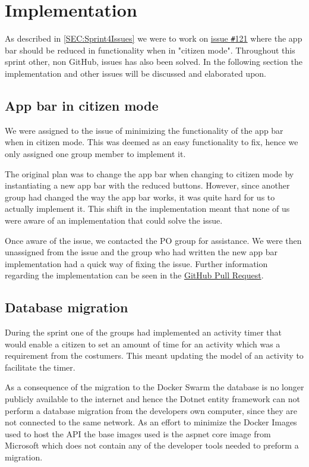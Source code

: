 \section{Implementation}
As described in \autoref{SEC:Sprint4Issues} we were to work on \href{https://github.com/aau-giraf/weekplanner/issues/121}{issue \texttt{\#}121} where the app bar should be reduced in functionality when in "citizen mode". 
Throughout this sprint other, non GitHub, issues has also been solved.
In the following section the implementation and other issues will be discussed and elaborated upon.

\subsection{App bar in citizen mode}
We were assigned to the issue of minimizing the functionality of the app bar when in citizen mode. 
This was deemed as an easy functionality to fix, hence we only assigned one group member to implement it. 

The original plan was to change the app bar when changing to citizen mode by instantiating a new app bar with the reduced buttons. 
However, since another group had changed the way the app bar works, it was quite hard for us to actually implement it.
This shift in the implementation meant that none of us were aware of an implementation that could solve the issue. 

Once aware of the issue, we contacted the PO group for assistance. 
We were then unassigned from the issue and the group who had written the new app bar implementation had a quick way of fixing the issue. 
Further information regarding the implementation can be seen in the \href{https://github.com/aau-giraf/weekplanner/pull/262}{GitHub Pull Request}.

\subsection{Database migration}
During the sprint one of the groups had implemented an activity timer that would enable a citizen to set an amount of time for an activity which was a requirement from the costumers.
This meant updating the model of an activity to facilitate the timer. 

As a consequence of the migration to the Docker Swarm the database is no longer publicly available to the internet and hence the Dotnet entity framework can not perform a database migration from the developers own computer, since they are not connected to the same network. 
As an effort to minimize the Docker Images used to host the API the base images used is the aspnet core image from Microsoft which does not contain any of the developer tools needed to preform a migration. 

